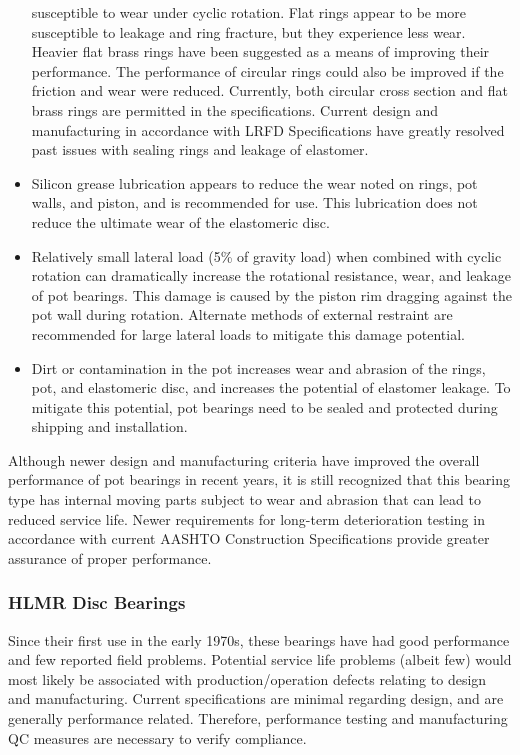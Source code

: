 \begin{itemize}
  susceptible to wear under cyclic rotation. Flat rings appear to be more susceptible to leakage and ring
  fracture, but they experience less wear. Heavier flat brass rings have been suggested as a means of improving
  their performance. The performance of circular rings could also be improved if the friction and wear were
  reduced. Currently, both circular cross section and flat brass rings are permitted in the specifications.
  Current design and manufacturing in accordance with LRFD Specifications have greatly resolved past issues
  with sealing rings and leakage of elastomer.
  \item Silicon grease lubrication appears to reduce the wear noted on rings, pot walls, and piston, and is
  recommended for use. This lubrication does not reduce the ultimate wear of the elastomeric disc.
  \item Relatively small lateral load (5\% of gravity load) when combined with cyclic rotation can dramatically
  increase the rotational resistance, wear, and leakage of pot bearings. This damage is caused by the piston rim
  dragging against the pot wall during rotation. Alternate methods of external restraint are recommended for
  large lateral loads to mitigate this damage potential.
  \item Dirt or contamination in the pot increases wear and abrasion of the rings, pot, and elastomeric disc, and
  increases the potential of elastomer leakage. To mitigate this potential, pot bearings need to be sealed and
  protected during shipping and installation.
\end{itemize}

Although newer design and manufacturing criteria have improved the overall performance of pot bearings in
recent years, it is still recognized that this bearing type has internal moving parts subject to wear and abrasion that
can lead to reduced service life. Newer requirements for long-term deterioration testing in accordance with current
AASHTO Construction Specifications provide greater assurance of proper performance.

\subsubsection{HLMR Disc Bearings}
Since their first use in the early 1970s, these bearings have had good performance and few reported field
problems. Potential service life problems (albeit few) would most likely be associated with production/operation defects relating to design and manufacturing. Current specifications are minimal regarding design, and are generally
performance related. Therefore, performance testing and manufacturing QC measures are necessary to verify
compliance.


